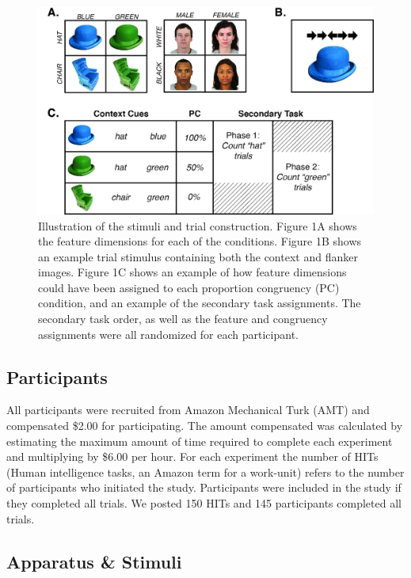 \documentclass[english,,man,floatsintext]{apa6}
\begin{document}
\begin{figure}
\centering
\includegraphics{images/Task.jpg}
\caption{\label{fig:figure1}Illustration of the stimuli and trial construction. Figure
1A shows the feature dimensions for each of the conditions. Figure 1B
shows an example trial stimulus containing both the context and flanker
images. Figure 1C shows an example of how feature dimensions could have
been assigned to each proportion congruency (PC) condition, and an
example of the secondary task assignments. The secondary task order, as
well as the feature and congruency assignments were all randomized for
each participant.}
\end{figure}

\subsection{Participants}\label{participants}

All participants were recruited from Amazon Mechanical Turk (AMT) and
compensated \$2.00 for participating. The amount compensated was
calculated by estimating the maximum amount of time required to complete
each experiment and multiplying by \$6.00 per hour. For each experiment
the number of HITs (Human intelligence tasks, an Amazon term for a
work-unit) refers to the number of participants who initiated the study.
Participants were included in the study if they completed all trials. We
posted 150 HITs and 145 participants completed all trials.

\subsection{Apparatus \& Stimuli}\label{apparatus-stimuli}
\end{document}
